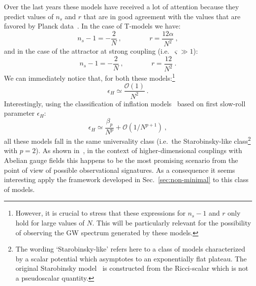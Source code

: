 Over the last years these models have received a lot of attention because they predict values of $n_s$ and $r$ that are in good agreement with the values that are favored by Planck data~\cite{Ade:2015xua,Ade:2015lrj}. In the case of T-models we have:
\begin{equation}
	n_s -1 = - \frac{2}{N} \ , \qquad \qquad r = \frac{12 \alpha}{N^2} \ ,
\end{equation}
and in the case of the attractor at strong coupling (i.e.~$\varsigma \gg 1$):
\begin{equation}
	n_s -1 = - \frac{2}{N} \ , \qquad \qquad r = \frac{12 }{N^2} \ .
\end{equation}
We can immediately notice that, for both these models:\footnote{However, it is crucial to stress that these expressions for $n_s -1$ and $r$ only hold for large values of $N$. This will be particularly relevant for the possibility of observing the GW spectrum generated by these models.}
\begin{equation}
\epsilon_H \simeq \frac{\mathcal{O}(1)}{N^2} \ .
\end{equation}
Interestingly, using the classification of inflation models~\cite{Mukhanov:2013tua,Roest:2013fha,Binetruy:2014zya} based on first slow-roll parameter $\epsilon_H$:
\begin{equation}
	\epsilon_H \simeq \frac{\beta_p}{N^p} + \mathcal{O}(1/N^{p+1}) \ ,
\end{equation}
all these models fall in the same universality class (i.e.\ the Starobinsky-like class\footnote{The wording `Starobinsky-like' refers here to a class of models characterized by a scalar potential which asymptotes to an exponentially flat plateau. The original Starobinsky model~\cite{Starobinsky:1980te} is constructed from the Ricci-scalar which is not a pseudoscalar quantity.} with $p=2$). As shown in~\cite{Domcke:2016bkh}, in the context of higher-dimensional couplings with Abelian gauge fields this happens to be the most promising scenario from the point of view of possible observational signatures. As a consequence it seems interesting apply the framework developed in Sec.~\ref{sec:non-minimal} to this class of models.



